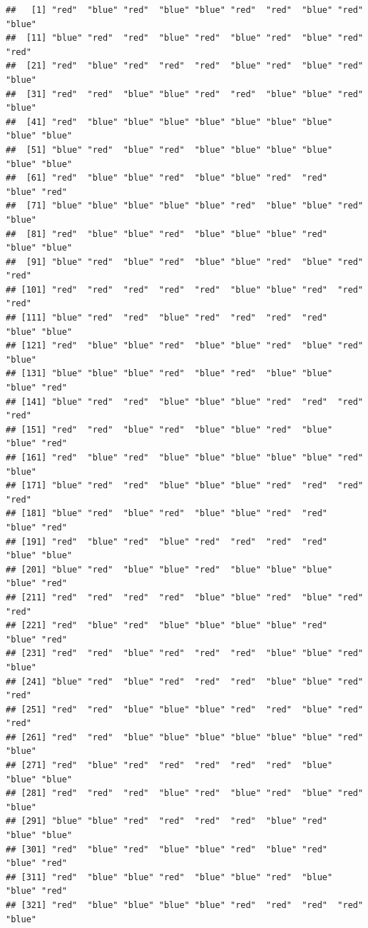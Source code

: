 \documentclass[
]{book}
\begin{document}
\begin{verbatim}
##   [1] "red"  "blue" "red"  "blue" "blue" "red"  "red"  "blue" "red"  "blue"
##  [11] "blue" "red"  "red"  "blue" "red"  "blue" "red"  "blue" "red"  "red" 
##  [21] "red"  "blue" "red"  "red"  "red"  "blue" "red"  "blue" "red"  "blue"
##  [31] "red"  "red"  "blue" "blue" "red"  "red"  "blue" "blue" "red"  "blue"
##  [41] "red"  "blue" "blue" "blue" "blue" "blue" "blue" "blue" "blue" "blue"
##  [51] "blue" "red"  "blue" "red"  "blue" "blue" "blue" "blue" "blue" "blue"
##  [61] "red"  "blue" "blue" "red"  "blue" "blue" "red"  "red"  "blue" "red" 
##  [71] "blue" "blue" "blue" "blue" "blue" "red"  "blue" "blue" "red"  "blue"
##  [81] "red"  "blue" "blue" "red"  "blue" "blue" "blue" "red"  "blue" "blue"
##  [91] "blue" "red"  "blue" "red"  "blue" "blue" "red"  "blue" "red"  "red" 
## [101] "red"  "red"  "red"  "red"  "red"  "blue" "blue" "red"  "red"  "red" 
## [111] "blue" "red"  "red"  "blue" "red"  "red"  "red"  "red"  "blue" "blue"
## [121] "red"  "blue" "blue" "red"  "blue" "blue" "red"  "blue" "red"  "blue"
## [131] "blue" "blue" "blue" "red"  "blue" "red"  "blue" "blue" "blue" "red" 
## [141] "blue" "red"  "red"  "blue" "blue" "blue" "red"  "red"  "red"  "red" 
## [151] "red"  "red"  "blue" "red"  "blue" "blue" "red"  "blue" "blue" "red" 
## [161] "red"  "blue" "red"  "blue" "blue" "blue" "blue" "blue" "red"  "blue"
## [171] "blue" "red"  "red"  "blue" "blue" "blue" "red"  "red"  "red"  "red" 
## [181] "blue" "red"  "blue" "red"  "blue" "blue" "red"  "red"  "blue" "red" 
## [191] "red"  "blue" "red"  "blue" "red"  "red"  "red"  "red"  "blue" "blue"
## [201] "blue" "red"  "blue" "blue" "red"  "blue" "blue" "blue" "blue" "red" 
## [211] "red"  "red"  "red"  "red"  "blue" "blue" "red"  "blue" "red"  "red" 
## [221] "red"  "blue" "red"  "blue" "blue" "blue" "blue" "red"  "blue" "red" 
## [231] "red"  "red"  "blue" "red"  "red"  "red"  "blue" "blue" "red"  "blue"
## [241] "blue" "red"  "blue" "red"  "red"  "red"  "blue" "blue" "red"  "red" 
## [251] "red"  "red"  "blue" "blue" "blue" "red"  "red"  "blue" "red"  "red" 
## [261] "red"  "red"  "blue" "blue" "blue" "blue" "blue" "blue" "red"  "blue"
## [271] "red"  "blue" "red"  "red"  "red"  "red"  "red"  "blue" "blue" "blue"
## [281] "red"  "red"  "red"  "blue" "red"  "blue" "red"  "blue" "red"  "blue"
## [291] "blue" "blue" "red"  "red"  "red"  "red"  "blue" "red"  "blue" "blue"
## [301] "red"  "blue" "red"  "blue" "blue" "red"  "blue" "red"  "blue" "red" 
## [311] "red"  "blue" "blue" "red"  "blue" "blue" "red"  "blue" "blue" "red" 
## [321] "red"  "blue" "blue" "blue" "blue" "red"  "red"  "red"  "red"  "blue"

\end{verbatim}
\end{document}

